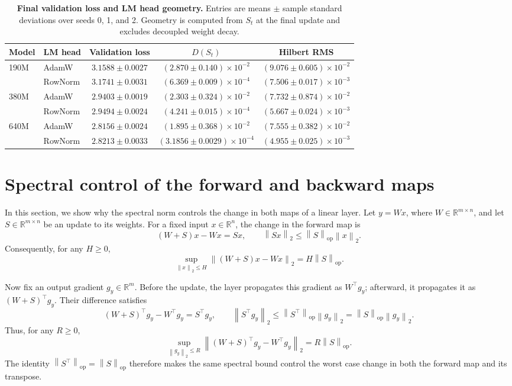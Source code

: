 \documentclass[anon]{opt2026} %
\newcommand{\R}{\mathbb{R}}
\newcommand{\norm}[1]{\left\lVert #1\right\rVert}
\begin{document}
\begin{table}[t]
\centering
\small
\setlength{\tabcolsep}{4pt}
\begin{tabular}{llccc}
\toprule
Model & LM head & Validation loss & $D(S_t)$ & Hilbert RMS \\
\midrule
190M & AdamW
 & $3.1588\pm0.0027$
 & $(2.870\pm0.140)\times10^{-2}$
 & $(9.076\pm0.605)\times10^{-2}$ \\
     & RowNorm
 & $3.1741\pm0.0031$
 & $(6.369\pm0.009)\times10^{-4}$
 & $(7.506\pm0.017)\times10^{-3}$ \\
\addlinespace
380M & AdamW
 & $2.9403\pm0.0019$
 & $(2.303\pm0.324)\times10^{-2}$
 & $(7.732\pm0.874)\times10^{-2}$ \\
     & RowNorm
 & $2.9494\pm0.0024$
 & $(4.241\pm0.015)\times10^{-4}$
 & $(5.667\pm0.024)\times10^{-3}$ \\
\addlinespace
640M & AdamW
 & $2.8156\pm0.0024$
 & $(1.895\pm0.368)\times10^{-2}$
 & $(7.555\pm0.382)\times10^{-2}$ \\
     & RowNorm
 & $2.8213\pm0.0033$
 & $(3.1856\pm0.0029)\times10^{-4}$
 & $(4.955\pm0.025)\times10^{-3}$ \\
\bottomrule
\end{tabular}
\caption{\textbf{Final validation loss and LM head geometry.} Entries are
means $\pm$ sample standard deviations over seeds 0, 1, and 2. Geometry is
computed from $S_t$ at the final update and excludes decoupled weight decay.}
\label{tab:experiment-results}
\end{table}

\FloatBarrier


\section{Spectral control of the forward and backward maps}
\label{app:muon-backward-change}

In this section, we show why the spectral norm controls the change in both
maps of a linear layer. Let $y=Wx$, where $W\in\R^{m\times n}$, and let
$S\in\R^{m\times n}$ be an update to its weights. For a fixed input
$x\in\R^n$, the change in the forward map is
\[
(W+S)x-Wx=Sx,
\qquad
\norm{Sx}_2\leq\norm{S}_{\mathrm{op}}\norm{x}_2.
\]
Consequently, for any $H\geq0$,
\[
\sup_{\norm{x}_2\leq H}
\norm{(W+S)x-Wx}_2
=
H\norm{S}_{\mathrm{op}}.
\]

Now fix an output gradient $g_y\in\R^m$. Before the update, the layer
propagates this gradient as $W^\top g_y$; afterward, it propagates it as
$(W+S)^\top g_y$. Their difference satisfies
\[
(W+S)^\top g_y-W^\top g_y=S^\top g_y,
\qquad
\norm{S^\top g_y}_2
\leq
\norm{S^\top}_{\mathrm{op}}\norm{g_y}_2
=
\norm{S}_{\mathrm{op}}\norm{g_y}_2.
\]
Thus, for any $R\geq0$,
\[
\sup_{\norm{g_y}_2\leq R}
\norm{(W+S)^\top g_y-W^\top g_y}_2
=
R\norm{S}_{\mathrm{op}}.
\]
The identity
$\norm{S^\top}_{\mathrm{op}}=\norm{S}_{\mathrm{op}}$ therefore makes the
same spectral bound control the worst case change in both the forward map
and its transpose.
\end{document}
